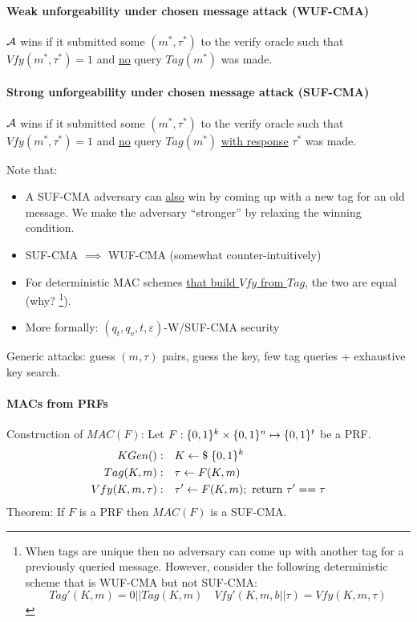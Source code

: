 \paragraph{Weak unforgeability under chosen message attack (WUF-CMA)}
$\mathcal{A}$ wins if it submitted some $(m^*, \tau^*)$ to the verify oracle such that $Vfy(m^*, \tau^*)=1$ and \underline{no} query $Tag(m^*)$ was made.

\paragraph{Strong unforgeability under chosen message attack (SUF-CMA)}
$\mathcal{A}$ wins if it submitted some $(m^*, \tau^*)$ to the verify oracle such that $Vfy(m^*, \tau^*)=1$ and \underline{no} query $Tag(m^*)$ \underline{with response} $\tau^*$ was made.

Note that:
\begin{itemize}
\item A SUF-CMA adversary can \underline{also} win by coming up with a new tag for an old message.
We make the adversary ``stronger'' by relaxing the winning condition.
\item SUF-CMA $\implies$ WUF-CMA (somewhat counter-intuitively)
\item For deterministic MAC schemes \underline{that build $Vfy$ from $Tag$}, the two are equal (why?%
\footnote{When tags are unique then no adversary can come up with another tag for a previously queried message.
However, consider the following deterministic scheme that is WUF-CMA but not SUF-CMA:
$$ Tag'(K, m) = 0 || Tag(K, m) \quad Vfy'(K, m, b||\tau) = Vfy(K, m, \tau)$$
}).
\item More formally: $(q_t, q_v, t, \varepsilon)$-W/SUF-CMA security
\end{itemize}

Generic attacks:
guess $(m, \tau)$ pairs, guess the key, few tag queries + exhaustive key search.

\paragraph{MACs from PRFs}
Construction of $MAC(F)$:
Let $F: \lbrace 0, 1 \rbrace^k \times \lbrace 0, 1 \rbrace^n \mapsto \lbrace 0, 1 \rbrace^t$ be a PRF.
\begin{align*}
KGen():& \quad K \leftarrow \$ \; \lbrace 0, 1 \rbrace^k \\
Tag(K, m):& \quad \tau \leftarrow F(K, m) \\
Vfy(K, m, \tau):& \quad \tau' \leftarrow F(K, m); \text{ return } \tau' == \tau
\end{align*}
%
Theorem:
If $F$ is a PRF then $MAC(F)$ is a SUF-CMA.

